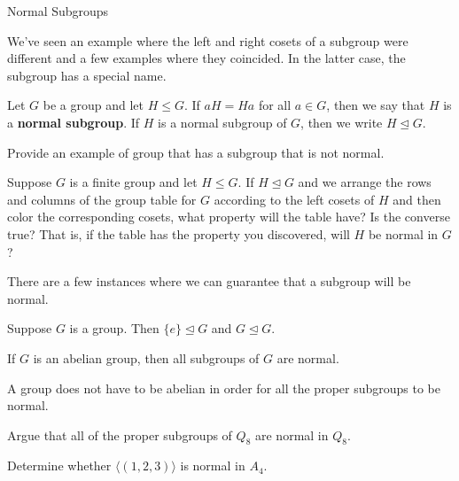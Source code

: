 \begin{section}{Normal Subgroups}

We've seen an example where the left and right cosets of a subgroup were different and a few examples where they coincided.  In the latter case, the subgroup has a special name.

\begin{definition}
Let $G$ be a group and let $H\leq G$.  If $aH=Ha$ for all $a\in G$, then we say that $H$ is a \textbf{normal subgroup}.  If $H$ is a normal subgroup of $G$, then we write $H\trianglelefteq G$.
\end{definition}

\begin{problem}
Provide an example of group that has a subgroup that is not normal.
\end{problem}

\begin{problem}\label{prob:checkerboard}
Suppose $G$ is a finite group and let $H\leq G$.  If $H\trianglelefteq G$ and we arrange the rows and columns of the group table for $G$ according to the left cosets of $H$ and then color the corresponding cosets, what property will the table have?  Is the converse true?  That is, if the table has the property you discovered, will $H$ be normal in $G$?
\end{problem}

There are a few instances where we can guarantee that a subgroup will be normal.

\begin{theorem}
Suppose $G$ is a group.  Then $\{e\}\trianglelefteq G$ and $G\trianglelefteq G$.
\end{theorem}

\begin{theorem}\label{thm:AbelianImpliesNormal}
If $G$ is an abelian group, then all subgroups of $G$ are normal.
\end{theorem}

A group does not have to be abelian in order for all the proper subgroups to be normal.

\begin{problem}\label{prob:all subgroups of Q8 are normal}
Argue that all of the proper subgroups of $Q_8$ are normal in $Q_8$. 
\end{problem}

\begin{problem}\label{prob:not normal in A4}
Determine whether $\langle (1,2,3)\rangle$ is normal in $A_4$.
\end{problem}


\end{section}
